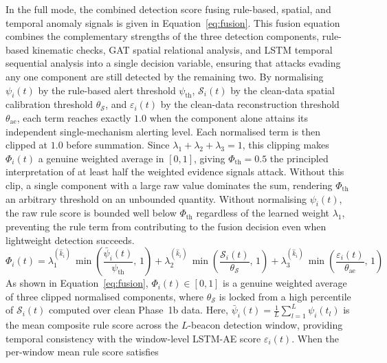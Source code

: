 \documentclass[12pt, a4paper]{report}
\begin{document}
In the full mode, the combined detection score fusing rule-based,
spatial, and temporal anomaly signals is given in
Equation~\ref{eq:fusion}.
\newline
\newline
This fusion equation combines the complementary strengths of the
three detection components, rule-based kinematic checks, GAT
spatial relational analysis, and LSTM temporal sequential analysis
 into a single decision variable, ensuring that attacks evading
any one component are still detected by the remaining two.
By normalising $\psi_i(t)$ by the rule-based alert threshold
$\psi_{\mathrm{th}}$, $\mathcal{S}_i(t)$ by the clean-data spatial
calibration threshold $\theta_{\mathcal{S}}$, and $\varepsilon_i(t)$
by the clean-data reconstruction threshold $\theta_{\mathrm{ae}}$,
each term reaches exactly $1.0$ when the component alone attains its
independent single-mechanism alerting level.
Each normalised term is then clipped at $1.0$ before summation.
Since $\lambda_1 + \lambda_2 + \lambda_3 = 1$, this clipping makes
$\Phi_i(t)$ a genuine weighted average in $[0,1]$, giving
$\Phi_{\mathrm{th}} = 0.5$ the principled interpretation of
at least half the weighted evidence signals attack.
Without this clip, a single component with a large raw value dominates
the sum, rendering $\Phi_{\mathrm{th}}$ an arbitrary threshold on an
unbounded quantity. Without normalising $\psi_i(t)$, the raw rule
score is bounded well below $\Phi_{\mathrm{th}}$ regardless of the
learned weight $\lambda_1$, preventing the rule term from contributing
to the fusion decision even when lightweight detection succeeds.
\begin{equation}
  \Phi_i(t) =
    \lambda_1^{(\hat{k}_i)}\,\min\!\left(\frac{\bar{\psi}_i(t)}{\psi_{\mathrm{th}}},\,1\right)
  + \lambda_2^{(\hat{k}_i)}\,\min\!\left(\frac{\mathcal{S}_i(t)}{\theta_{\mathcal{S}}},\,1\right)
  + \lambda_3^{(\hat{k}_i)}\,\min\!\left(\frac{\varepsilon_i(t)}{\theta_{\mathrm{ae}}},\,1\right)
  \label{eq:fusion}
\end{equation}
As shown in Equation~\ref{eq:fusion}, $\Phi_i(t) \in [0,1]$ is a
genuine weighted average of three clipped normalised components,
where $\theta_{\mathcal{S}}$ is locked from a high percentile of
$\mathcal{S}_i(t)$ computed over clean Phase~1b data.
Here, $\bar{\psi}_i(t) = \tfrac{1}{L}\sum_{l=1}^{L}\psi_i(t_l)$ is
the mean composite rule score across the $L$-beacon detection window,
providing temporal consistency with the window-level LSTM-AE score
$\varepsilon_i(t)$.
When the per-window mean rule score satisfies
\end{document}
